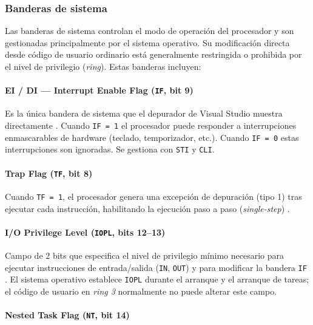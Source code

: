 \documentclass[a4paper,12pt]{article}
\begin{document}
\subsubsection*{Banderas de sistema}

Las banderas de sistema controlan el modo de operación del procesador y son gestionadas principalmente por el sistema operativo. Su modificación directa desde código de usuario ordinario está generalmente restringida o prohibida por el nivel de privilegio (\textit{ring}). Estas banderas incluyen:

\paragraph*{EI / DI — Interrupt Enable Flag (\texttt{IF}, bit 9)}

Es la única bandera de sistema que el depurador de Visual Studio muestra directamente \cite{tanenbaum2013structured}. Cuando \texttt{IF = 1} el procesador puede responder a interrupciones enmascarables de hardware (teclado, temporizador, etc.). Cuando \texttt{IF = 0} estas interrupciones son ignoradas. Se gestiona con \texttt{STI} y \texttt{CLI}.

\paragraph*{Trap Flag (\texttt{TF}, bit 8)}

Cuando \texttt{TF = 1}, el procesador genera una excepción de depuración (tipo 1) tras ejecutar cada instrucción, habilitando la ejecución paso a paso (\textit{single-step}) \cite{stallings2019computer}.

\paragraph*{I/O Privilege Level (\texttt{IOPL}, bits 12--13)}

Campo de 2 bits que especifica el nivel de privilegio mínimo necesario para ejecutar instrucciones de entrada/salida (\texttt{IN}, \texttt{OUT}) y para modificar la bandera \texttt{IF} \cite{patterson2016computer}. El sistema operativo establece \texttt{IOPL} durante el arranque y el arranque de tareas; el código de usuario en \textit{ring 3} normalmente no puede alterar este campo.

\paragraph*{Nested Task Flag (\texttt{NT}, bit 14)}
\end{document}
